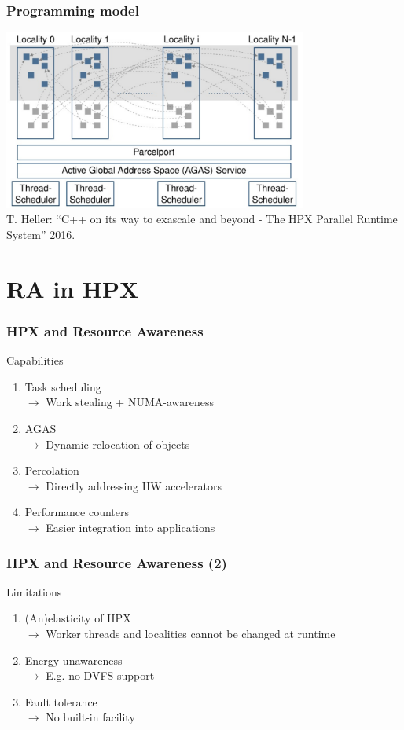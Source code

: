 \documentclass[compress]{beamer}
\begin{document}
\begin{frame}
	\frametitle{Programming model}
	\begin{center}
		\includegraphics[width=100mm]{Figures/hpxProgrammingModel4.png}\\
		\vspace{3mm}
		\tiny T. Heller: “C++ on its way to exascale and beyond - The HPX Parallel Runtime System” 2016.
		\normalsize
	\end{center}
\end{frame}

\section{RA in HPX}
\begin{frame}
	\frametitle{HPX and Resource Awareness}
	\pause
	Capabilities
	\begin{enumerate}
		\item Task scheduling\\
			\small $\longrightarrow$ Work stealing + NUMA-awareness
		\normalsize
		\pause
		\item AGAS\\
			\small $\longrightarrow$ Dynamic relocation of objects
		\normalsize
		\pause
		\item Percolation\\
			\small $\longrightarrow$ Directly addressing HW accelerators
		\normalsize
		\pause
		\item Performance counters\\
			\small $\longrightarrow$ Easier integration into applications
		\normalsize
	\end{enumerate}
\end{frame}

\begin{frame}
	\frametitle{HPX and Resource Awareness (2)}
	Limitations
	\begin{enumerate}
		\item (An)elasticity of HPX\\
			\small $\longrightarrow$ Worker threads and localities cannot be changed at runtime
		\normalsize
		\pause
		\item Energy unawareness\\
			\small $\longrightarrow$ E.g. no DVFS support
		\normalsize
		\pause
		\item Fault tolerance\\
			\small $\longrightarrow$ No built-in facility
		\normalsize
	\end{enumerate}
\end{frame}
\end{document}
